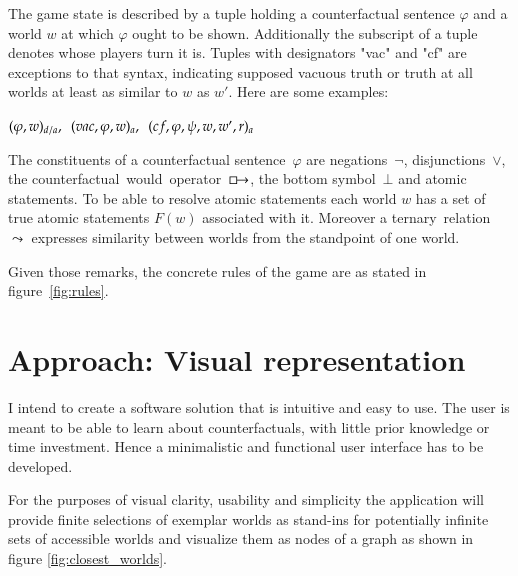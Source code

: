 \documentclass[a4paper,american]{paper}
\begin{document}
The game state is described by a tuple holding a counterfactual sentence $\varphi$ and a world $w$ at which $\varphi$ ought to be shown. Additionally the subscript of a tuple denotes whose players turn it is. Tuples with designators "vac" and "cf" are exceptions to that syntax, indicating supposed vacuous truth or truth at all worlds at least as similar to $w$ as $w'$. Here are some examples:

\begin{center}
$(\varphi ,w)_{d/a},\hspace{5px}(vac,\varphi ,w)_a,\hspace{5px}(cf,\varphi ,\psi ,w,w',r)_a$
\end{center}

The constituents of a counterfactual sentence~$\varphi$ are negations~$\neg$, disjunctions~$\vee$, the counterfactual~would~operator~$\boxright$, the bottom symbol~$\bot$ and atomic statements. To be able to resolve atomic statements each world $w$  has a set of true atomic statements $F(w)$ associated with it. Moreover a {ternary~relation~$\leadsto$} expresses similarity between worlds from the standpoint of one world.

Given those remarks, the concrete rules of the game are as stated in figure~\ref{fig:rules}.

\section*{Approach: Visual representation}

I intend to create a software solution that is intuitive and easy to use. The user is meant to be able to learn about counterfactuals, with little prior knowledge or time investment. Hence a minimalistic and functional user interface has to be developed.

For the purposes of visual clarity, usability and simplicity the application will provide finite selections of exemplar worlds as stand-ins for potentially infinite sets of accessible worlds and visualize them as nodes of a graph as shown in figure \ref{fig:closest_worlds}.
\end{document}
